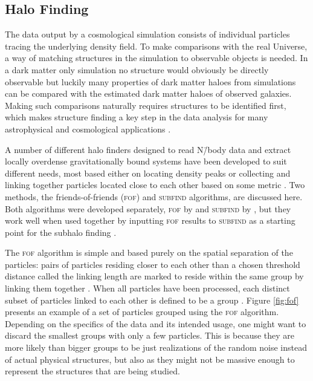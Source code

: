 \documentclass[english, twoside]{HYgradu}
\begin{document}
\subsection{Halo Finding} \label{sect:halofinding}
The data output by a cosmological simulation consists of individual particles tracing the underlying density field. To make comparisons with the real Universe, a way of matching structures in the simulation to observable objects is needed. In a dark matter only simulation no structure would obviously be directly observable but luckily many properties of dark matter haloes from simulations can be compared with the estimated dark matter haloes of observed galaxies. Making such comparisons naturally requires structures to be identified first, which makes structure finding a key step in the data analysis for many astrophysical and cosmological applications \citep{knebe2013structure}.

A number of different halo finders designed to read N\=/body data and extract locally overdense gravitationally bound systems have been developed to suit different needs, most based either on locating density peaks or collecting and linking together particles located close to each other based on some metric \citep{knebe2013structure}. Two methods, the friends-of-friends (\textsc{fof}) and \textsc{subfind} algorithms, are discussed here. Both algorithms were developed separately, \textsc{fof} by \citet{davis1985evolution} and \textsc{subfind} by \citet{springel2001populating}, but they work well when used together by inputting \textsc{fof} results to \textsc{subfind} as a starting point for the subhalo finding \citep{springel2005cosmological}.

The \textsc{fof} algorithm is simple and based purely on the spatial separation of the particles: pairs of particles residing closer to each other than a chosen threshold distance called the linking length are marked to reside within the same group by linking them together \citep{davis1985evolution}. When all particles have been processed, each distinct subset of particles linked to each other is defined to be a group \citep{davis1985evolution}. Figure \ref{fig:fof} presents an example of a set of particles grouped using the \textsc{fof} algorithm. Depending on the specifics of the data and its intended usage, one might want to discard the smallest groups with only a few particles. This is because they are more likely than bigger groups to be just realizations of the random noise instead of actual physical structures, but also as they might not be massive enough to represent the structures that are being studied.
\end{document}
